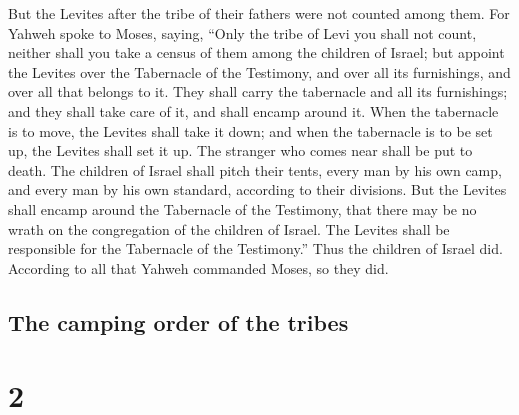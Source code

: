  But the Levites after the tribe of their fathers were
not counted among them.  For Yahweh spoke to Moses,
saying,  ``Only the tribe of Levi you shall not count,
neither shall you take a census of them among the children of Israel;
 but appoint the Levites over the Tabernacle of the
Testimony, and over all its furnishings, and over all that belongs to
it. They shall carry the tabernacle and all its furnishings; and they
shall take care of it, and shall encamp around it.  When
the tabernacle is to move, the Levites shall take it down; and when the
tabernacle is to be set up, the Levites shall set it up. The stranger
who comes near shall be put to death.  The children of
Israel shall pitch their tents, every man by his own camp, and every man
by his own standard, according to their divisions.  But
the Levites shall encamp around the Tabernacle of the Testimony, that
there may be no wrath on the congregation of the children of Israel. The
Levites shall be responsible for the Tabernacle of the Testimony.''
 Thus the children of Israel did. According to all that
Yahweh commanded Moses, so they did.

\hypertarget{the-camping-order-of-the-tribes}{%
\subsection{The camping order of the
tribes}\label{the-camping-order-of-the-tribes}}

\hypertarget{section-1}{%
\section{2}\label{section-1}}

